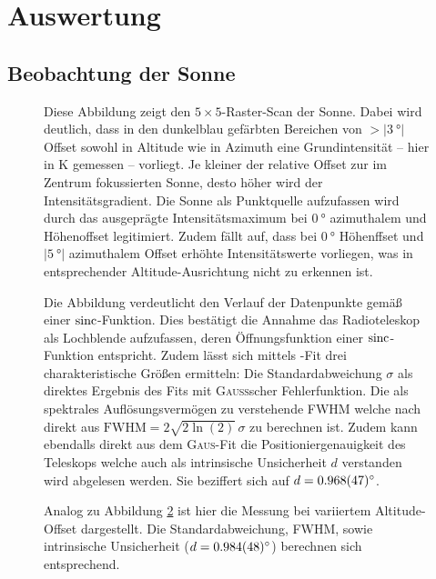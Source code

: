 \section{Auswertung}
    \subsection{Beobachtung der Sonne}
    \begin{figure}[H]
        \centering
        
        \caption[Raster-Scan der Sonne]{Diese Abbildung zeigt den $5 \times 5$-Raster-Scan der Sonne. Dabei wird deutlich, dass in den dunkelblau gefärbten Bereichen von $>\vert \SI{3}{\degree}\vert$ Offset sowohl in Altitude wie in Azimuth eine Grundintensität -- hier in \si{\kelvin} gemessen -- vorliegt. Je kleiner der relative Offset zur im Zentrum fokussierten Sonne, desto höher wird der Intensitätsgradient. Die Sonne als Punktquelle aufzufassen wird durch das ausgeprägte Intensitätsmaximum bei $\SI{0}{\degree}$ azimuthalem und Höhenoffset legitimiert. Zudem fällt auf, dass bei $\SI{0}{\degree}$ Höhenffset und $\vert\SI{5}{\degree}\vert$ azimuthalem Offset erhöhte Intensitätswerte vorliegen, was in entsprechender Altitude-Ausrichtung nicht zu erkennen ist.}
        \label{fig:Sonnenabbild}
    \end{figure}

    \begin{figure}[H]
        \centering
        
        \caption[Kreuz-Scan der Sonne, Azimuthaler Offset]{Die Abbildung verdeutlicht den Verlauf der Datenpunkte gemäß einer $\operatorname{sinc}$-Funktion. Dies bestätigt die Annahme das Radioteleskop als Lochblende aufzufassen, deren Öffnungsfunktion einer $\operatorname{sinc}$-Funktion entspricht. Zudem lässt sich mittels -Fit drei charakteristische Größen ermitteln: Die Standardabweichung $\sigma$ als direktes Ergebnis des Fits mit \textsc{Gauß}scher Fehlerfunktion. Die als spektrales Auflösungsvermögen zu verstehende FWHM welche nach \cite{wiki:FWHM} direkt aus $\text{FWHM} = 2\sqrt{2\ln(2)} \, \sigma$ zu berechnen ist. Zudem kann ebendalls direkt aus dem \textsc{Gaus}-Fit die Positioniergenauigkeit des Teleskops welche auch als intrinsische Unsicherheit $d$ verstanden wird abgelesen werden. Sie beziffert sich auf $d = \SI{0.968 \pm 0.047}{\degree}$.}
        \label{fig:Sonnenkreuz_Az}
    \end{figure}

    \begin{figure}[H]
        \centering
        
        \caption[Kreuz-Scan der Sonne, Altitude Offset]{Analog zu Abbildung \ref{fig:Sonnenkreuz_Az} ist hier die Messung bei variiertem Altitude-Offset dargestellt. Die Standardabweichung, FWHM, sowie intrinsische Unsicherheit ($d = \SI{0.984 \pm 0.048}{\degree}$) berechnen sich entsprechend.}
        \label{fig:Sonnenkreuz_Alt}
    \end{figure}

